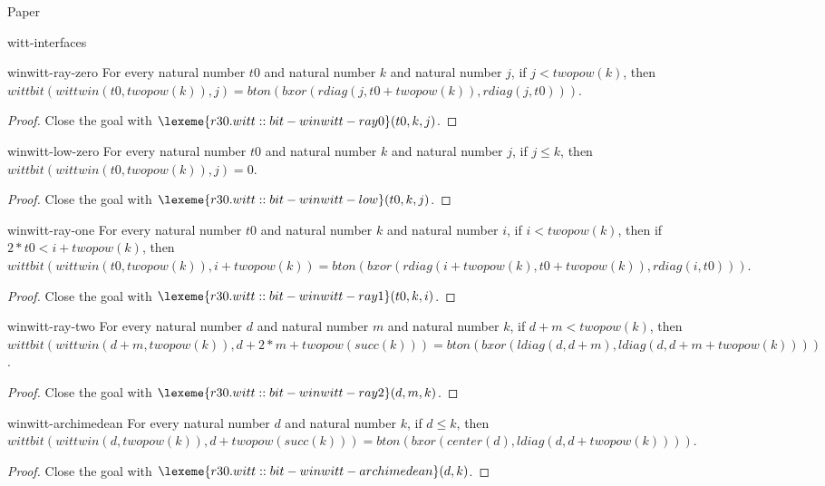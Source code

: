 \begin{lexlean}{Paper}
\begin{section}{witt-interfaces}
  \begin{theorem}{winwitt-ray-zero}
  For every natural number \(t0\) and natural number \(k\) and natural number \(j\), if \(j < twopow(k)\), then \(wittbit(wittwin(t0, twopow(k)), j) = bton(bxor(rdiag(j, t0 + twopow(k)), rdiag(j, t0)))\).
  \begin{proof}
  Close the goal with \(\lexeme{r30.witt::bit-winwitt-ray0}(t0, k, j)\).
  \end{proof}
  \end{theorem}

  \begin{theorem}{winwitt-low-zero}
  For every natural number \(t0\) and natural number \(k\) and natural number \(j\), if \(j ≤ k\), then \(wittbit(wittwin(t0, twopow(k)), j) = 0\).
  \begin{proof}
  Close the goal with \(\lexeme{r30.witt::bit-winwitt-low}(t0, k, j)\).
  \end{proof}
  \end{theorem}

  \begin{theorem}{winwitt-ray-one}
  For every natural number \(t0\) and natural number \(k\) and natural number \(i\), if \(i < twopow(k)\), then if \(2 * t0 < i + twopow(k)\), then \(wittbit(wittwin(t0, twopow(k)), i + twopow(k)) = bton(bxor(rdiag(i + twopow(k), t0 + twopow(k)), rdiag(i, t0)))\).
  \begin{proof}
  Close the goal with \(\lexeme{r30.witt::bit-winwitt-ray1}(t0, k, i)\).
  \end{proof}
  \end{theorem}

  \begin{theorem}{winwitt-ray-two}
  For every natural number \(d\) and natural number \(m\) and natural number \(k\), if \(d + m < twopow(k)\), then \(wittbit(wittwin(d + m, twopow(k)), d + 2 * m + twopow(succ(k))) = bton(bxor(ldiag(d, d + m), ldiag(d, d + m + twopow(k))))\).
  \begin{proof}
  Close the goal with \(\lexeme{r30.witt::bit-winwitt-ray2}(d, m, k)\).
  \end{proof}
  \end{theorem}

  \begin{theorem}{winwitt-archimedean}
  For every natural number \(d\) and natural number \(k\), if \(d ≤ k\), then \(wittbit(wittwin(d, twopow(k)), d + twopow(succ(k))) = bton(bxor(center(d), ldiag(d, d + twopow(k))))\).
  \begin{proof}
  Close the goal with \(\lexeme{r30.witt::bit-winwitt-archimedean}(d, k)\).
  \end{proof}
  \end{theorem}


\end{section}
\end{lexlean}
